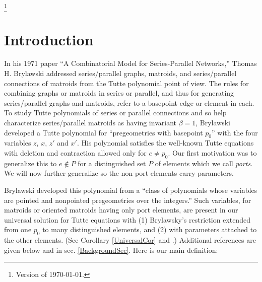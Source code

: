 \documentclass[12pt,leqno]{amsart}
\theoremstyle{remark}
\begin{document}




\thanks{Version of \today.}

\maketitle
\pagestyle{headings}


\section{Introduction}



In his 1971 paper \cite{BrylawskiPointed}
``A Combinatorial Model for Series-Parallel Networks,''
Thomas H. Brylawski
addressed
series/parallel graphs, matroids,
and series/parallel connections of matroids
from the Tutte polynomial point of view.
The rules for 
combining graphs or matroids in series or parallel,
and thus for generating series/parallel graphs and matroids,
refer to
a basepoint edge or element in each.
To study 
Tutte polynomials of series or parallel connections
and so help
characterize
series/parallel matroids as having 
invariant $\beta=1$,
Brylawski developed
a Tutte polynomial for ``pregeometries with basepoint $p_0$'' 
with the four variables $z$, $x$, $z'$ and $x'$.   
His polynomial satisfies
the well-known Tutte equations with deletion and contraction
allowed only for $e\neq p_0$.  
Our first motivation was to generalize this to $e\not\in P$
for a distinguished set $P$ of elements which we call 
\emph{ports}\cite{sdcPorted,MR0419272,SetPointedLV}.  We will
now further generalize so the non-port elements carry parameters.

Brylawski developed this
polynomial from
a ``class of polynomials whose variables are pointed and
nonpointed pregeometries over the integers.''
Such variables, for matroids or oriented matroids
having only port elements, are present
in our universal solution for 
Tutte equations with (1) Brylawsky's restriction extended
from one $p_0$ to many distinguished elements, and (2)
with parameters attached to the other elements.
(See Corollary \ref{UniversalCor} and \cite{sdcPorted}.)
Additional references are given below and in
sec. \ref{BackgroundSec}.  Here is our main definition:
\end{document}
